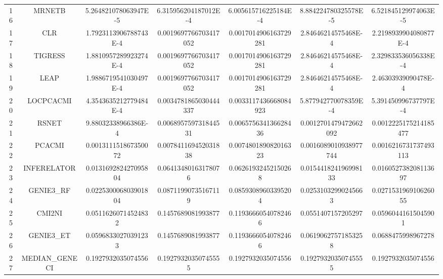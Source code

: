 \documentclass[a4paper,10pt]{article}
\begin{document}
\begin{landscape}
\begin{table}[!htp]
\begin{tabular}{ccccccc}
16&MRNETB&5.264821078063947E-5&6.315956204187012E-4&6.005615716225184E-4&8.884224780325578E-5&6.521845129974063E-5\\
17&CLR&1.7923113906788743E-4&0.0019697766703417052&0.0017014906163729281&2.84646214575468E-4&2.2198939904080877E-4\\
18&TIGRESS&1.8810957289923274E-4&0.0019697766703417052&0.0017014906163729281&2.84646214575468E-4&2.329833536056338E-4\\
19&LEAP&1.9886719541030497E-4&0.0019697766703417052&0.0017014906163729281&2.84646214575468E-4&2.46303939090478E-4\\
20&LOCPCACMI&4.3543635212779484E-4&0.0034781865030444337&0.0033117436668084923&5.877942770078359E-4&5.391450996737797E-4\\
21&RSNET&9.88032338966386E-4&0.006895759731844531&0.006575634136628436&0.0012701479472662092&0.0012225175214185477\\
22&PCACMI&0.001311151867350072&0.007841169452031838&0.007480189082016323&0.0016089010938977744&0.0016216731737493113\\
23&INFERELATOR&0.013169282427095804&0.06413480163178076&0.06261932452150268&0.015441824196998133&0.016052738208113697\\
24&GENIE3_RF&0.022530006803901804&0.08711990735167119&0.08593089603395204&0.02531032990245663&0.027153196910626055\\
25&CMI2NI&0.05116260714524832&0.1457689081993877&0.11936660540782466&0.0551407157205297&0.05960441615045901\\
26&GENIE3_ET&0.05968330270391233&0.1457689081993877&0.11936660540782466&0.06190627571853258&0.0688475998967278\\
27&MEDIAN_GENECI&0.1927932035074556&0.19279320350745555&0.1927932035074556&0.19279320350745555&0.1927932035074556\\
\hline
\end{tabular}
\end{table}


\newpage


\end{landscape}
\end{document}
